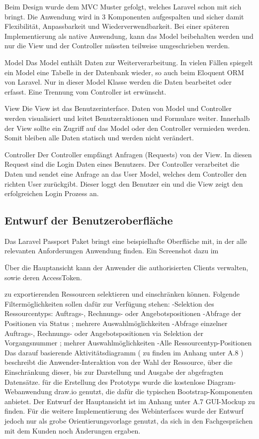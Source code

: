 Beim Design wurde dem MVC Muster gefolgt, welches Laravel schon mit sich bringt. Die Anwendung wird in 3 Komponenten aufgespalten und sicher damit Flexibilität, Anpassbarkeit und Wiederverwendbarkeit.
Bei einer späteren Implementierung als native Anwendung, kann das Model beibehalten werden und nur die View und der Controller müssten teilweise umgeschrieben werden.

Model
Das Model enthält Daten zur Weiterverarbeitung. In vielen Fällen spiegelt ein Model
eine Tabelle in der Datenbank wieder, so auch beim Eloquent ORM von Laravel. Nur in dieser Model Klasse werden die Daten bearbeitet oder erfasst. Eine Trennung vom Controller ist erwünscht.

View
Die View ist das Benutzerinterface. Daten von Model und Controller werden visualisiert und leitet \zB Benutzeraktionen und Formulare weiter. Innerhalb der View sollte ein Zugriff auf das Model oder den Controller vermieden werden. Somit bleiben alle Daten statisch und werden nicht verändert.

Controller
Der Controller empfängt Anfragen (Requests) von der View. In diesen Request sind \bspw die Login Daten eines Benutzers. Der Controller verarbeitet die Daten und sendet eine Anfrage an das User Model, welches dem Controller den richten User zurückgibt. Dieser loggt den Benutzer ein und die View zeigt den erfolgreichen Login Prozess an. 



\subsection{Entwurf der Benutzeroberfläche}
\label{sec:Benutzeroberflaeche} 

Das Laravel Passport Paket bringt eine beispielhafte Oberfläche mit, in der alle relevanten Anforderungen Anwendung finden. 
Ein Screenshot dazu im 

Über die Hauptansicht kann der Anwender die authorisierten Clients verwalten, sowie deren AccessToken. 

zu exportierenden Ressourcen selektieren und
einschränken können. Folgende Filtermöglichkeiten sollen dafür zur Verfügung stehen:
-Selektion des Ressourcentyps: Auftrags-, Rechnungs- oder Angebotspositionen
-Abfrage der Positionen via Status ; mehrere Auswahlmöglichkeiten
-Abfrage einzelner Auftrags-, Rechnungs- oder Angebotspositionen via Selektion der
Vorgangsnummer ; mehrer Auswahlmöglichkeiten
-Alle Ressourcentyp-Positionen
Das darauf basierende Aktivitätsdiagramm ( zu finden im Anhang unter A.8 ) beschreibt die
Anwender-Interaktion von der Wahl der Ressource, über die Einschränkung dieser, bis zur
Darstellung und Ausgabe der abgefragten Datensätze.
für die Erstellung des Prototyps wurde die kostenlose Diagram-Webanwendung draw.io
genutzt, die dafür die typischen Bootstrap-Komponenten anbietet. Der Entwurf der
Hauptansicht ist im Anhang unter A.7 GUI-Mockup zu finden.
Für die weitere Implementierung des Webinterfaces wurde der Entwurf jedoch nur als grobe
Orientierungsvorlage genutzt, da sich in den Fachgesprächen mit dem Kunden noch
Änderungen ergaben.


